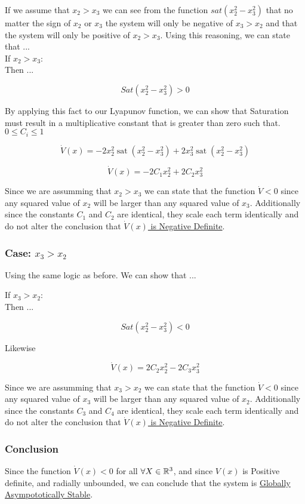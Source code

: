 If we assume that $x_2 > x_3$ we can see from the function $sat(x_2^2 - x_3^2)$ that no matter the sign of  $x_2$ or $x_3$ the system will only be negative of $x_3>x_2$ and that the system will only be positive of $x_2 > x_3$. Using this reasoning, we can state that ... \\

\noindent If $x_2 > x_3$: \\

\noindent Then ...

$$
Sat(x_2^2 - x_3^2) > 0
$$

\noindent By applying this fact to our Lyapunov function, we can show that Saturation must result in a multiplicative constant that is greater than zero such that. $ 0 \leq C_i \leq 1 $


$$
 \dot{V}(x)=-2 x_{2}^{2} \operatorname{sat}\left(x_{2}^{2}-x_{3}^{2}\right)+2 x_{3}^{2} \operatorname{sat}\left(x_{2}^{2}-x_{3}^{2}\right)
$$

$$
 \dot{V}(x)=-2C_1 x_{2}^{2} + 2 C_2 x_{3}^{2}
$$

\noindent Since we are assumming that $x_2 > x_3$ we can state that the function $\dot{V} < 0$ since any squared value of $x_2$ will be larger than any squared value of $x_3$. Additionally since the constants $C_1$ and $C_2$ are identical, they scale each term identically and do not alter the conclusion that \underline{$\dot{V}(x)$ is Negative Definite}.


\subsubsection*{Case: $x_3 > x_2$}

Using the same logic as before. We can show that ...

\noindent If $x_3 > x_2$: \\

\noindent Then ...

$$
Sat(x_2^2 - x_3^2) < 0
$$


\noindent Likewise

$$
 \dot{V}(x)=2C_2 x_{2}^{2} - 2 C_3 x_{3}^{2}
$$

\noindent Since we are assumming that $x_3 > x_2$ we can state that the function $\dot{V} < 0$ since any squared value of $x_3$ will be larger than any squared value of $x_2$. Additionally since the constants $C_3$ and $C_4$ are identical, they scale each term identically and do not alter the conclusion that \underline{$\dot{V}(x)$ is Negative Definite}.



\subsubsection*{Conclusion}

Since the function $\dot{V}(x) < 0 $ for all $\forall X \in \mathbb{R}^3$, and since $V(x)$ is Positive definite, and radially unbounded, we can conclude that the system is \underline{Globally Asympototically Stable}.
